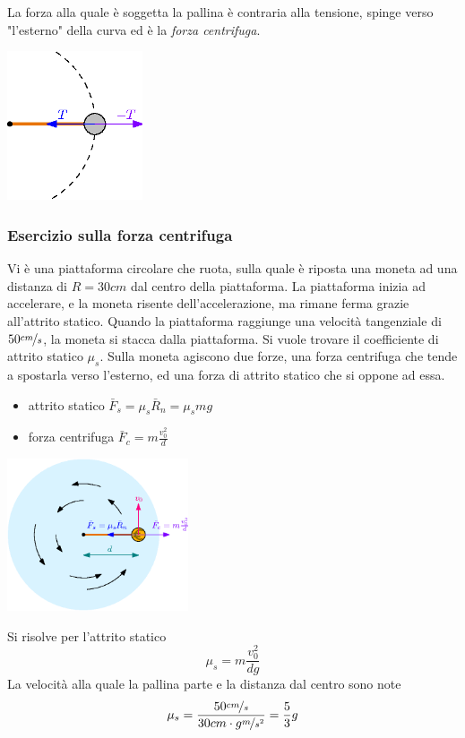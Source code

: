 \documentclass[10pt, letterpaper]{report}
\begin{document}
La forza alla quale è soggetta la pallina è contraria alla tensione, spinge verso "l'esterno" della curva ed 
è la \textit{forza centrifuga}.\begin{center}
    \includegraphics[width=0.3\textwidth]{images/forzaCent2.eps}
\end{center}
\subsubsection{Esercizio sulla forza centrifuga}
Vi è una piattaforma circolare che ruota, sulla quale è riposta una moneta ad una distanza di $R=30cm$ dal centro 
della piattaforma. La piattaforma inizia ad accelerare, e la moneta risente dell'accelerazione, ma rimane 
ferma grazie all'attrito statico. Quando la piattaforma raggiunge una velocità 
tangenziale di $50\nicefrac{cm}{s}$, la moneta si stacca dalla piattaforma. Si vuole trovare il coefficiente 
di attrito statico $\mu_s$.\acc 
Sulla moneta agiscono due forze, una forza centrifuga che tende a spostarla verso l'esterno, ed una forza di 
attrito statico che si oppone ad essa. \begin{itemize}
\item attrito statico $\bar F_s=\mu_s\bar R_n=\mu_s mg$
\item forza centrifuga $\bar F_c=m\frac{v_0^2}{d}$
\end{itemize}\begin{center}
    \includegraphics[width=0.4\textwidth]{images/forzaCent3.eps}
\end{center}
Si risolve per l'attrito statico 
$$ \mu_s=m\frac{v_0^2}{dg}$$
La velocità alla quale la pallina parte e la distanza dal centro sono note 
$$ \mu_s=\frac{50 \nicefrac{cm}{s}}{30cm\cdot g\nicefrac{m}{s^2}}=\frac{5}{3}g$$
\end{document}

